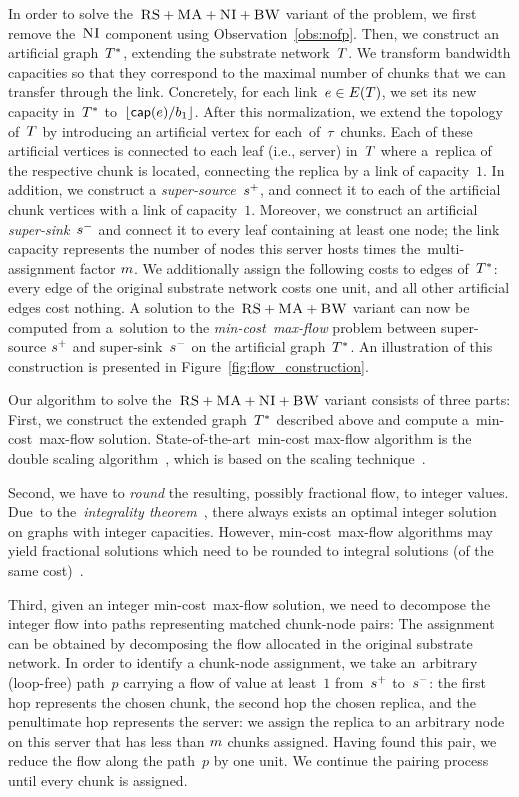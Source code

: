 In order to solve the~$\textsc{RS}+\textsc{MA}+\textsc{NI}+\textsc{BW}$ variant of the {\CTE} problem,
we first remove the~$\textsc{NI}$ component using Observation~\ref{obs:nofp}.
Then, we construct
an artificial graph~$T^*$, extending the substrate network~$T$.
We transform bandwidth capacities so that they correspond to the maximal number of chunks that we can transfer through the link.
Concretely, for each link~$e\in E(T)$, we set its new
capacity in~$T^*$ to~$\lfloor\textsf{cap}(e) / b_1\rfloor$.
After this normalization, we extend the topology of~$T$ by
introducing an artificial vertex for each~of~$\tau$~chunks. Each of these artificial
vertices is connected to each leaf (i.e., server) in~$T$ where a~replica
 of the respective chunk is located,
connecting the replica by a link of capacity~$1$. In
addition, we construct a
\emph{super-source}~$s^{+}$, and connect it to each of the artificial chunk
vertices with a link of capacity~$1$. Moreover, we construct an artificial \emph{super-sink}~$s^{-}$ and
connect it to every leaf containing at least one node; the link capacity represents
the number of nodes this server hosts times the~multi-assignment factor
$m$.
We additionally assign the following costs to edges of~$T^*$:
every edge of the original substrate network costs one unit, and all other artificial edges
cost nothing.
A solution to the~$\textsc{RS}+\textsc{MA}+\textsc{BW}$ variant can now be computed
from a~solution to the \emph{min-cost~max-flow} problem between super-source
$s^{+}$ and
super-sink~$s^{-}$ on the artificial graph~$T^*$.
An illustration of this construction is presented in Figure~\ref{fig:flow_construction}.

Our algorithm to solve the~$\textsc{RS}+\textsc{MA}+\textsc{NI}+\textsc{BW}$ variant consists of three parts:
First, we construct the extended graph~$T^*$
described above and compute
a~min-cost~max-flow solution.
State-of-the-art~min-cost max-flow algorithm is the double scaling algorithm~\cite{mincostmaxflow-state}, which is based on the scaling technique~\cite{mincostmaxflow-1,mincostmaxflow-2}.

Second, we have to \emph{round} the resulting, possibly fractional flow, to
integer values. Due~to the~\emph{integrality theorem}~\cite{flow-book},
there always exists an optimal integer solution on graphs with integer capacities.
However, min-cost~max-flow algorithms may yield fractional solutions
which need to be rounded to integral solutions (of the same cost)~\cite{electric-flows}.

Third, given an integer min-cost~max-flow solution, we need to decompose
the integer flow into paths
representing matched chunk-node pairs:
The assignment can be obtained by decomposing the flow allocated in the
original substrate network. In order to identify a chunk-node assignment,
we take an~arbitrary (loop-free) path~$p$ carrying a flow of value at least~$1$ from~$s^{+}$ to~$s^{-}$:
the first hop represents the chosen chunk, the second hop the chosen
replica, and the penultimate hop represents the server: we assign
the replica to an arbitrary node on this server that has less than $m$ chunks assigned.
Having found this pair, we reduce the flow
along the path~$p$ by one unit.
We continue the pairing process until every chunk is assigned.

